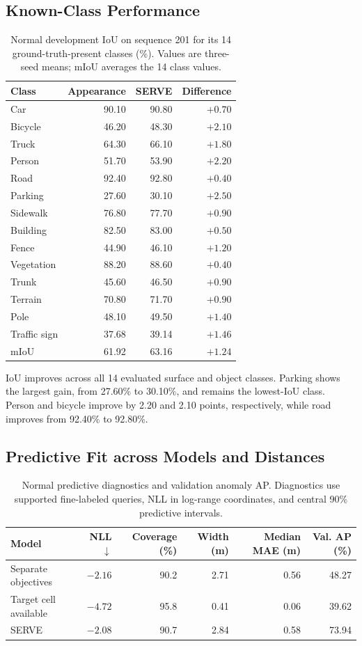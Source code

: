 \documentclass{article}
\begin{document}
\subsection{Known-Class Performance}
\begin{table}[ht]
\centering
\caption{Normal development IoU on sequence 201 for its 14 ground-truth-present classes (\%). Values are three-seed means; mIoU averages the 14 class values.}
\begin{tabular}{lrrr}
\toprule
Class & Appearance & SERVE & Difference\\
\midrule
Car & 90.10 & 90.80 & $+0.70$\\
Bicycle & 46.20 & 48.30 & $+2.10$\\
Truck & 64.30 & 66.10 & $+1.80$\\
Person & 51.70 & 53.90 & $+2.20$\\
Road & 92.40 & 92.80 & $+0.40$\\
Parking & 27.60 & 30.10 & $+2.50$\\
Sidewalk & 76.80 & 77.70 & $+0.90$\\
Building & 82.50 & 83.00 & $+0.50$\\
Fence & 44.90 & 46.10 & $+1.20$\\
Vegetation & 88.20 & 88.60 & $+0.40$\\
Trunk & 45.60 & 46.50 & $+0.90$\\
Terrain & 70.80 & 71.70 & $+0.90$\\
Pole & 48.10 & 49.50 & $+1.40$\\
Traffic sign & 37.68 & 39.14 & $+1.46$\\
\midrule
mIoU & 61.92 & 63.16 & $+1.24$\\
\bottomrule
\end{tabular}
\end{table}
IoU improves across all 14 evaluated surface and object classes. Parking shows the largest gain, from 27.60\% to 30.10\%, and remains the lowest-IoU class. Person and bicycle improve by 2.20 and 2.10 points, respectively, while road improves from 92.40\% to 92.80\%.

\subsection{Predictive Fit across Models and Distances}
\begin{table}[ht]
\centering
\caption{Normal predictive diagnostics and validation anomaly AP. Diagnostics use supported fine-labeled queries, NLL in log-range coordinates, and central 90\% predictive intervals.}
\begin{tabular}{lrrrrr}
\toprule
Model & NLL$\downarrow$ & Coverage (\%) & Width (m) & Median MAE (m) & Val. AP (\%)\\
\midrule
Separate objectives & $-2.16$ & 90.2 & 2.71 & 0.56 & 48.27\\
Target cell available & $-4.72$ & 95.8 & 0.41 & 0.06 & 39.62\\
SERVE & $-2.08$ & 90.7 & 2.84 & 0.58 & 73.94\\
\bottomrule
\end{tabular}
\end{table}
\end{document}
